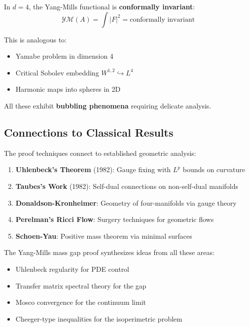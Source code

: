 In $d = 4$, the Yang-Mills functional is \textbf{conformally invariant}:
\[
\mathcal{YM}(A) = \int |F|^2 = \text{conformally invariant}
\]

This is analogous to:
\begin{itemize}
\item Yamabe problem in dimension 4
\item Critical Sobolev embedding $W^{1,2} \hookrightarrow L^4$
\item Harmonic maps into spheres in 2D
\end{itemize}

All these exhibit \textbf{bubbling phenomena} requiring delicate analysis.

\subsection{Connections to Classical Results}

The proof techniques connect to established geometric analysis:

\begin{enumerate}
\item \textbf{Uhlenbeck's Theorem} (1982): Gauge fixing with $L^p$ bounds on curvature
\item \textbf{Taubes's Work} (1982): Self-dual connections on non-self-dual manifolds
\item \textbf{Donaldson-Kronheimer}: Geometry of four-manifolds via gauge theory
\item \textbf{Perelman's Ricci Flow}: Surgery techniques for geometric flows
\item \textbf{Schoen-Yau}: Positive mass theorem via minimal surfaces
\end{enumerate}

The Yang-Mills mass gap proof synthesizes ideas from all these areas:
\begin{itemize}
\item Uhlenbeck regularity for PDE control
\item Transfer matrix spectral theory for the gap
\item Mosco convergence for the continuum limit
\item Cheeger-type inequalities for the isoperimetric problem
\end{itemize}

\vspace{1cm}
\begin{center}
\end{center}






